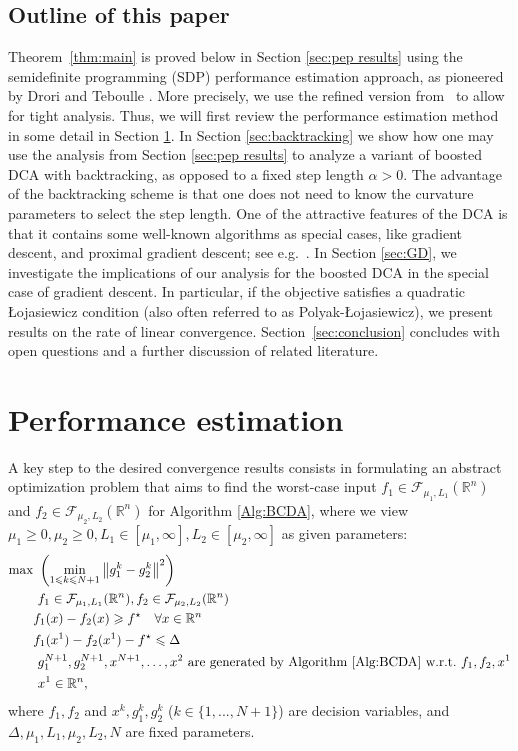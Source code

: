 \documentclass{article} %
\renewcommand{\leq}{\leqslant}
\renewcommand{\geq}{\geqslant}
\begin{document}
\subsection*{Outline of this paper}
Theorem~\ref{thm:main} is proved below in Section \ref{sec:pep results} using the semidefinite programming (SDP) performance estimation approach, as pioneered by Drori and Teboulle \cite{drori2014performance}. More precisely, we use the refined version from~\cite{taylor2017smooth, Taylor} to allow for tight analysis. Thus, we will first review the performance estimation method in some detail in Section \ref{sec:PEP}.
{ In Section \ref{sec:backtracking} we show how one may use the analysis from Section \ref{sec:pep results} to analyze a variant of boosted DCA with  backtracking, as opposed to a fixed step length $\alpha > 0$. The advantage of the backtracking scheme is that one does not need to know the curvature parameters to select the step length.}
One of the attractive features of the DCA is that it contains some well-known algorithms as special cases, like gradient descent, and proximal gradient descent; see e.g.\ \cite{rotaru2025tight}. In Section \ref{sec:GD}, we investigate the implications of our analysis for the boosted DCA in the special case of gradient descent. In particular, if the objective satisfies a quadratic \L{}ojasiewicz condition (also often referred to as Polyak-\L{}ojasiewicz), we present results on the rate of linear convergence. Section~\ref{sec:conclusion} concludes with open questions and a further discussion of related literature.

\section{Performance estimation}
\label{sec:PEP}

A key step to the desired convergence results consists in formulating an abstract optimization problem that aims to find the worst-case input $ f_1 \in \mathcal{F}_{\mu_1,L_1}(\mathbb{R}^n)$ and
$f_2 \in \mathcal{F}_{\mu_2,L_2}(\mathbb{R}^n)$ for Algorithm \ref{Alg:BCDA}, where we view $\mu_1 \ge 0,\mu_2\ge 0,L_1 \in [\mu_1,\infty],L_2 \in [\mu_2,\infty]$ as given parameters:
\begin{equation}
\begin{aligned}
   \max & \ \left(\min_{1\leq k\leq N+1} \left\|g_1^k-g_2^k\right\|^2\right)\\  & \ f_1\in \mathcal{F}_{\mu_1,L_1}(\mathbb{R}^n), f_2\in \mathcal{F}_{\mu_2,L_2}(\mathbb{R}^n)\\
& f_1(x)-f_2(x)\geq f^\star  \ \ \ \forall x\in\mathbb{R}^n\\
  &  f_1(x^1)-f_2(x^1)-f^\star\leq \Delta\\
&  \  g_1^{N+1}, g_2^{N+1},  x^{N+1}, \ldots, x^2 \ \textrm{are generated  by Algorithm \ref{Alg:BCDA}  w.r.t.}\ f_1, f_2, x^1  \\
  & \ x^1\in\mathbb{R}^n,
\end{aligned}\label{eq:base_PEP}
\end{equation}
where $f_1, f_2$ and $x^k, g_1^k, g_2^k$ ($k\in\{1, ..., N+1\}$) are decision variables, and $\Delta,\mu_1,L_1,\mu_2,L_2, N$ are fixed parameters.
\end{document}
